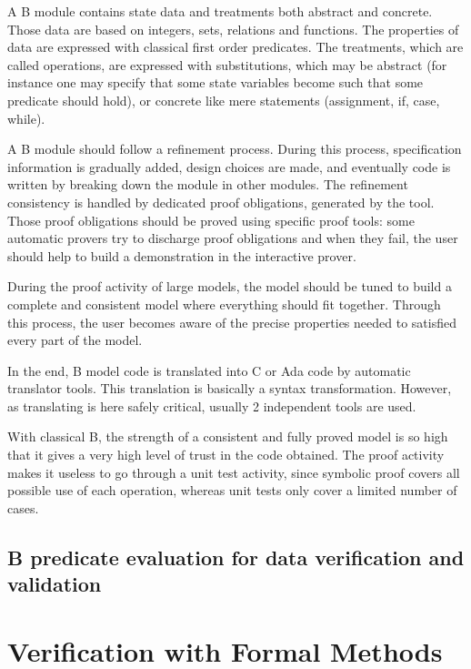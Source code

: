 A B module contains state data and treatments both abstract and
concrete. Those data are based on integers, sets, relations and
functions. The properties of data are expressed with classical first
order predicates. The treatments, which are called operations, are
expressed with substitutions, which may be abstract (for instance one
may specify that some state variables become such that some predicate
should hold), or concrete like mere statements (assignment, if, case,
while).

A B module should follow a refinement process. During this process,
specification information is gradually added, design choices are made,
and eventually code is written by breaking down the module in other
modules. The refinement consistency is handled by dedicated proof
obligations, generated by the tool. Those proof obligations should be
proved using specific proof tools: some automatic provers try to
discharge proof obligations and when they fail, the user should help
to build a demonstration in the interactive prover.

During the proof activity of large models, the model should be tuned
to build a complete and consistent model where everything should fit
together. Through this process, the user becomes aware of the precise
properties needed to satisfied every part of the model.

In the end, B model code is translated into C or Ada code by automatic
translator tools. This translation is basically a syntax
transformation. However, as translating is here safely critical,
usually 2 independent tools are used.

With classical B, the strength of a consistent and fully proved model
is so high that it gives a very high level of trust in the code
obtained. The proof activity makes it useless to go through a unit
test activity, since symbolic proof covers all possible use of each
operation, whereas unit tests only cover a limited number of cases.

\section{B predicate evaluation for data verification and validation}

\chapter{Verification with Formal Methods}

